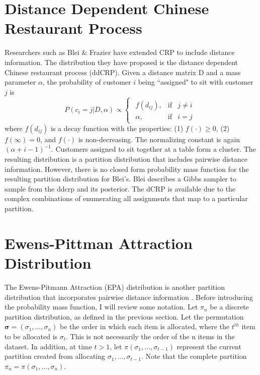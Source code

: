 

\section{Distance Dependent Chinese Restaurant Process}
Researchers such as Blei \& Frazier have extended CRP to include distance
information. The distribution they have proposed is the distance dependent
Chinese restaurant process (ddCRP). Given a distance matrix D and a mass
parameter $\alpha$, the probability of customer $i$ being ``assigned" to sit
with customer $j$ is 
\begin{equation}
  P(c_i=j|D,\alpha) \propto 
  \begin{cases}
    \begin{array}{rll}
      f(d_{ij}), & \text{if} & j \ne i\\
      \alpha,    & \text{if} & i=j
    \end{array}  
  \end{cases}
\end{equation}
where $f(d_{ij})$ is a decay function with the properties: (1) $f(\cdot) \ge
0$, (2) $f(\infty) = 0$, and $f(\cdot)$ is non-decreasing. The normalizing
constant is again $(\alpha+i-1)^{-1}$. Customers assigned to sit together at a
table form a cluster. The resulting distribution is a partition distribution
that includes pairwise distance information. However, there is no closed form
probability mass function for the resulting partition distribution for Blei's.
Blei describes a Gibbs sampler to sample from the ddcrp and its posterior. The
dCRP is available due to the complex combinations of enumerating all
assignments that map to a particular partition.

\section{Ewens-Pittman Attraction Distribution}
The Ewens-Pitmann Attraction (EPA) distribution is another partition
distribution that incorporates pairwise distance information \cite{epa}.
Before introducing the probability mass function, I will review some notation.
Let $\pi_n$ be a discrete partition distribution, as defined in the previous
section. Let the permutation $\bm \sigma = (\sigma_1,...,\sigma_n)$ be the
order in which each item is allocated, where the $t^{th}$ item to be allocated
is $\sigma_t$. This is not necessarily the order of the n items in the dataset.
In addition, at time $t > 1$, let $\pi(\sigma_{1},...,\sigma_{t-1})$ represent
the current partition created from allocating $\sigma_{1},...,\sigma_{t-1}$.
Note that the complete partition $\pi_n = \pi(\sigma_{1},...,\sigma_{n})$.\\


